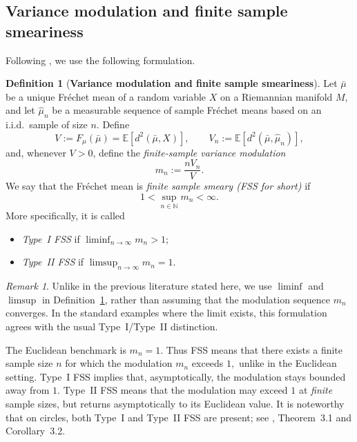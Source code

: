 \documentclass{amsart}
\theoremstyle{definition}
\newtheorem{definition}[theorem]{Definition}
\theoremstyle{remark}
\newtheorem{remark}[theorem]{Remark}
\newcommand{\mubar}{\bar{\mu}}
\newcommand\0{\boldsymbol{0}}
\begin{document}
\subsection{Variance modulation and finite sample smeariness}
\label{subsec:intro-FSS}

Following \citet{HH2,HuckemannEltznerHundrieser2021SmearinessBegetsFSS,EltznerFSSonspheres}, we use the following formulation.

\begin{definition}[\textbf{Variance modulation and finite sample smeariness}]
\label{def:FSS}
Let \(\mubar\) be a unique Fr\'echet mean of a random variable \(X\) on a Riemannian manifold \(M\), and let \(\hat\mu_n\) be a measurable sequence of sample Fr\'echet means based on an i.i.d.\ sample of size \(n\). Define
\[
V:=F_\mu(\mubar)=\mathbb E[d^2(\mubar,X)],\qquad
V_n:=\mathbb E[d^2(\mubar,\hat\mu_n)],
\]
and, whenever \(V>0\), define the \textit{finite-sample variance modulation}
\[
m_n:=\frac{nV_n}{V}.
\]
We say that the Fr\'echet mean is \emph{finite sample smeary (FSS for short)} if
\[
1<\sup_{n\in\mathbb N}m_n<\infty.
\]
More specifically, it is called
\begin{itemize}
\item[(i)] \emph{Type~I FSS} if \(\liminf_{n\to\infty}m_n>1\);
\item[(ii)] \emph{Type~II FSS} if \(\limsup_{n\to\infty}m_n=1\).
\end{itemize}
\end{definition}

\begin{remark}\label{rmk:FSS-liminf-limsup}
Unlike in the previous literature stated here, we use \(\liminf\) and \(\limsup\) in Definition~\ref{def:FSS}, rather than assuming that the modulation sequence \(m_n\) converges.  In the standard examples where the limit exists, this formulation agrees with the usual Type~I/Type~II distinction.
\end{remark}

The Euclidean benchmark is \(m_n=1\).  Thus FSS means that there exists a finite sample size $n$ for which the modulation $m_n$ exceeds $1,$ unlike in the Euclidean setting. Type~I FSS implies that, asymptotically, the modulation stays bounded away from \(1\). Type~II FSS means that the modulation may exceed \(1\) at \textit{finite} sample sizes, but returns asymptotically to its Euclidean value. It is noteworthy that on circles, both Type~I and Type~II FSS are present; see \citet{HH2}, Theorem~3.1 and Corollary~3.2.
\end{document}
